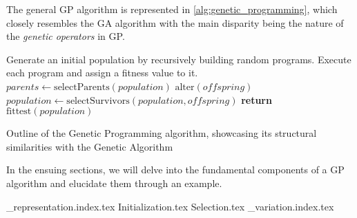   The general GP algorithm is represented in \vref{alg:genetic_programming}, which
  closely resembles the GA algorithm with the main disparity being the nature of
  the \textit{genetic operators} in GP.

  \begin{algorithm}[ht!]
    \begin{algorithmic}[1]
      \State Generate an initial population by recursively building random programs.
      \State Execute each program and assign a fitness value to it.
      \Repeat
        \State \(\mathit{parents} \gets \mathrm{selectParents}(\mathit{population})\) 
        \State \(\mathrm{alter}(\mathit{offspring})\) 
        \State \(\mathit{population} \gets \mathrm{selectSurvivors}(
          \mathit{population}, \mathit{offspring})\) 
      \State \textbf{return} \(\mathrm{fittest}(\mathit{population})\) 
    \end{algorithmic}
    \caption{
      Outline of the Genetic Programming algorithm, showcasing its structural 
      similarities with the Genetic Algorithm
    }
    \label{alg:genetic_programming}
  \end{algorithm}

  In the ensuing sections, we will delve into the fundamental components of a GP
  algorithm and elucidate them through an example.

  {_representation.index.tex}
  {Initialization.tex}
  {Selection.tex}
  {_variation.index.tex}
%
